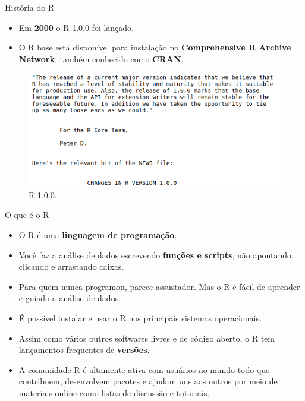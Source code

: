 \documentclass[
  ignorenonframetext,
  serif,
  professionalfont,
  usenames,
  dvipsnames,
  aspectratio = 169]{beamer}
\def\beginAHalfColumn{\begin{minipage}{0.49\textwidth}}%
\def\endColumns{\end{minipage}}%
\begin{document}
\begin{frame}{História do R}
\protect\hypertarget{histuxf3ria-do-r-3}{}
\beginAHalfColumn

\begin{itemize}
\item
  Em \textbf{2000} o R 1.0.0 foi lançado.
\item
  O R base está disponível para instalação no
  \textbf{Comprehensive R Archive Network}, também conhecido como
  \textbf{CRAN}.
\end{itemize}

\endColumns
\beginAHalfColumn

\begin{figure}

{\centering \includegraphics[width=0.8\linewidth]{./img/r110} 

}

\caption{R 1.0.0.}\label{fig:unnamed-chunk-8}
\end{figure}

\endColumns
\end{frame}

\begin{frame}{O que é o R}
\protect\hypertarget{o-que-uxe9-o-r}{}
\begin{itemize}
\item
  O R é uma \textbf{linguagem de programação}.
\item
  Você faz a análise de dados escrevendo \textbf{funções e scripts}, não
  apontando, clicando e arrastando caixas.
\item
  Para quem nunca programou, parece assustador. Mas o R é fácil de
  aprender e guiado a análise de dados.
\item
  É possível instalar e usar o R nos principais sistemas operacionais.
\item
  Assim como vários outros softwares livres e de código aberto, o R tem
  lançamentos frequentes de \textbf{versões}.
\item
  A comunidade R é altamente ativa com usuários no mundo todo que
  contribuem, desenvolvem pacotes e ajudam uns aos outros por meio de
  materiais online como listas de discussão e tutoriais.
\end{itemize}
\end{frame}
\end{document}

